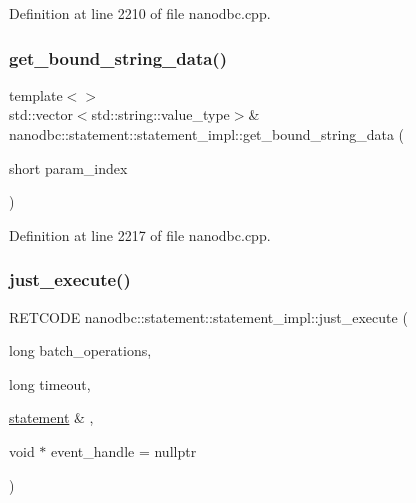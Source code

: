 Definition at line 2210 of file nanodbc.\+cpp.

\mbox{\label{classnanodbc_1_1statement_1_1statement__impl_a8738ec306bdb5ed7269af73b86cd08dc}} 
\subsubsection{\texorpdfstring{get\_bound\_string\_data()}{get\_bound\_string\_data()}\hspace{0.1cm}{\footnotesize\ttfamily [3/3]}}
{\footnotesize\ttfamily template$<$$>$ \\
std\+::vector$<$std\+::string\+::value\+\_\+type$>$\& nanodbc\+::statement\+::statement\+\_\+impl\+::get\+\_\+bound\+\_\+string\+\_\+data (\begin{DoxyParamCaption}\item[{short}]{param\+\_\+index }\end{DoxyParamCaption})}



Definition at line 2217 of file nanodbc.\+cpp.

\mbox{\label{classnanodbc_1_1statement_1_1statement__impl_ad810dcade95494a6f6fceeb702ca4367}} 
\subsubsection{\texorpdfstring{just\_execute()}{just\_execute()}}
{\footnotesize\ttfamily R\+E\+T\+C\+O\+DE nanodbc\+::statement\+::statement\+\_\+impl\+::just\+\_\+execute (\begin{DoxyParamCaption}\item[{long}]{batch\+\_\+operations,  }\item[{long}]{timeout,  }\item[{\mbox{\hyperlink{classnanodbc_1_1statement}{statement}} \&}]{,  }\item[{void $\ast$}]{event\+\_\+handle = {\ttfamily nullptr} }\end{DoxyParamCaption})\hspace{0.3cm}{\ttfamily [inline]}}



